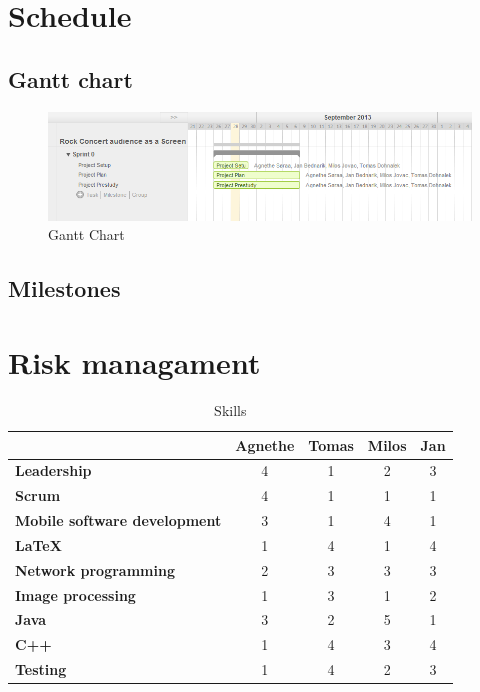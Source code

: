 \documentclass{article}
\newcommand{\ra}[1]{\renewcommand{\arraystretch}{#1}}
\begin{document}
  
\section{Schedule}
\subsection{Gantt chart}

\begin{figure}[ht]
\begin{center}
    \includegraphics[scale=0.6]{images/gantt}
    \caption{Gantt Chart}
    \label{img:gantt}
\end{center}
\end{figure}

\subsection{Milestones}
\section{Risk managament}

\begin{table}\centering \ra{1.3}
    \caption{Skills}
    \label{tab:skills}
    \vspace{2mm}
    \begin{tabular}{lcccc}
    \toprule
                                & Agnethe   & Tomas & Milos & Jan \\
    \midrule
    \textbf{Leadership                 } & 4         & 1     & 2     & 3     \\ 
    \textbf{Scrum                      } & 4         & 1     & 1     & 1     \\ 
    \textbf{Mobile software development} & 3         & 1     & 4     & 1     \\ 
    \textbf{\LaTeX                     } & 1         & 4     & 1     & 4     \\ 
    \textbf{Network programming        } & 2         & 3     & 3     & 3     \\ 
    \textbf{Image processing           } & 1         & 3     & 1     & 2     \\ 
    \textbf{Java                       } & 3         & 2     & 5     & 1     \\ 
    \textbf{C++                        } & 1         & 4     & 3     & 4     \\ 
    \textbf{Testing                    } & 1         & 4     & 2     & 3     \\
    \bottomrule
    \end{tabular}
\end{table}
\end{document}
